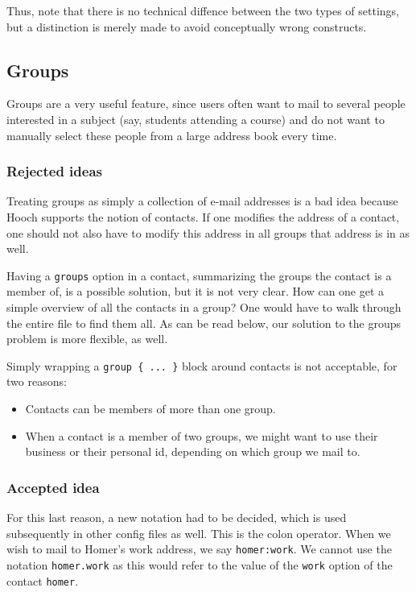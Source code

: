 \documentclass[a4paper]{article}
\begin{document}
Thus, note that there is no technical diffence between the two types of
settings, but a distinction is merely made to avoid conceptually wrong
constructs.


\subsection{Groups}

Groups are a very useful feature, since users often want to mail to
several people interested in a subject (say, students attending a
course) and do not want to manually select these people from a large
address book every time.

\subsubsection{Rejected ideas}

Treating groups as simply a collection of e-mail addresses is a bad idea
because Hooch supports the notion of contacts.  If one modifies the
address of a contact, one should not also have to modify this address in
all groups that address is in as well.

Having a \texttt{groups} option in a contact, summarizing the groups the
contact is a member of, is a possible solution, but it is not very
clear.  How can one get a simple overview of all the contacts in a
group?  One would have to walk through the entire file to find them all.
As can be read below, our solution to the groups problem is more
flexible, as well.

Simply wrapping a \verb=group { ... }= block around contacts is not
acceptable, for two reasons:

\begin{itemize}
\item Contacts can be members of more than one group.
\item When a contact is a member of two groups, we might want to use
      their business or their personal id, depending on which group we
      mail to.
\end{itemize}

\subsubsection{Accepted idea}

For this last reason, a new notation had to be decided, which is used
subsequently in other config files as well.  This is the colon operator.
When we wish to mail to Homer's work address, we say
\texttt{homer:work}.  We cannot use the notation \texttt{homer.work} as
this would refer to the value of the \texttt{work} option of
the contact \texttt{homer}.
\end{document}
